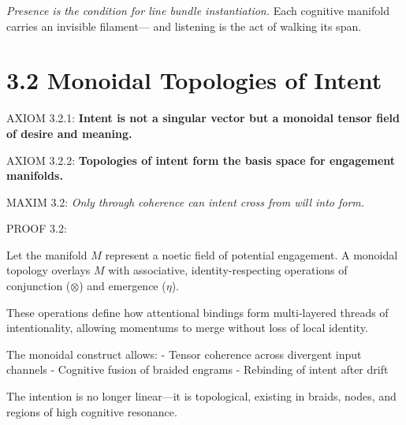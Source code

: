 \noindent
\textit{Presence is the condition for line bundle instantiation.}
Each cognitive manifold carries an invisible filament—
and listening is the act of walking its span.

\section*{3.2 Monoidal Topologies of Intent}


\noindent
AXIOM 3.2.1: \textbf{Intent is not a singular vector but a monoidal tensor field of desire and meaning.}

\noindent
AXIOM 3.2.2: \textbf{Topologies of intent form the basis space for engagement manifolds.}

\noindent
MAXIM 3.2: \textit{Only through coherence can intent cross from will into form.}

\noindent
PROOF 3.2:

Let the manifold \( M \) represent a noetic field of potential engagement.
A monoidal topology overlays \( M \) with associative, identity-respecting operations of conjunction (\( \otimes \)) and emergence (\( \eta \)).

These operations define how attentional bindings form multi-layered threads of intentionality,
allowing momentums to merge without loss of local identity.

The monoidal construct allows:
- Tensor coherence across divergent input channels
- Cognitive fusion of braided engrams
- Rebinding of intent after drift

The intention is no longer linear—it is topological, existing in braids, nodes, and regions of high cognitive resonance.

\begin{tcolorbox}[colback=black!1, colframe=OriaAmber, title=\textbf{Topology of Intent Manifold}, sharp corners=south]
\begin{center}
\end{center}
\end{tcolorbox}

